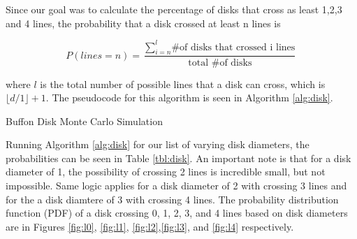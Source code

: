 \documentclass{article}
\begin{document}
Since our goal was to calculate the percentage of  disks that cross as least 1,2,3 and 4 lines, the probability that a disk crossed at least n lines is

\[
    P(lines =n)=\frac{\sum_{i=n}^l\text{\# of disks that crossed i lines}}{\text{total \# of disks}}
\]

where $l$ is the total number of possible lines that a disk can cross, which is $\lfloor{d / 1}\rfloor + 1$. The pseudocode for this algorithm is seen in Algorithm \ref{alg:disk}. 



\begin{algorithm}[hbt!]
    \caption{Buffon Disk Monte Carlo Simulation}\label{alg:disk}
\end{algorithm}

Running Algorithm \ref{alg:disk} for our list of varying disk diameters, the probabilities can be seen in Table \ref{tbl:disk}. An important note is that for a disk diameter of 1, the possibility of crossing 2 lines is incredible small, but not impossible. Same logic applies for a disk diameter of 2 with crossing 3 lines and for the a disk diamtere of 3 with crossing 4 lines. The probability distribution function (PDF) of a disk crossing 0, 1, 2, 3, and 4 lines based on disk diameters are in Figures \ref{fig:l0}, \ref{fig:l1}, \ref{fig:l2},\ref{fig:l3}, and \ref{fig:l4} respectively. 
\end{document}
